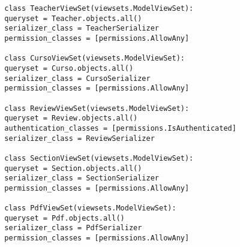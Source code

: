 \begin{enumerate}
\begin{verbatim}
		class TeacherViewSet(viewsets.ModelViewSet):
		queryset = Teacher.objects.all()
		serializer_class = TeacherSerializer
		permission_classes = [permissions.AllowAny]
		
		class CursoViewSet(viewsets.ModelViewSet):
		queryset = Curso.objects.all()
		serializer_class = CursoSerializer
		permission_classes = [permissions.AllowAny]
		
		class ReviewViewSet(viewsets.ModelViewSet):
		queryset = Review.objects.all()
		authentication_classes = [permissions.IsAuthenticated]
		serializer_class = ReviewSerializer
		
		class SectionViewSet(viewsets.ModelViewSet):
		queryset = Section.objects.all()
		serializer_class = SectionSerializer
		permission_classes = [permissions.AllowAny]
		
		class PdfViewSet(viewsets.ModelViewSet):
		queryset = Pdf.objects.all()
		serializer_class = PdfSerializer
		permission_classes = [permissions.AllowAny]	
	\end{verbatim}
\end{enumerate}
